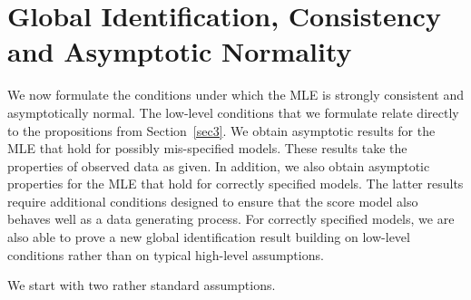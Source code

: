 



























\section{Global Identification, Consistency and Asymptotic Normality} %
\label{sec4}


We now formulate the conditions under which the MLE is strongly consistent and asymptotically normal.
The low-level conditions that we formulate relate directly to the propositions from
Section~\ref{sec3}.
We obtain asymptotic results for the MLE that hold for possibly mis-specified models. These results take the properties of observed data as given. In addition, we also obtain asymptotic properties for the MLE that hold for correctly specified models. The latter results require additional conditions designed to ensure that the score model also behaves well as a data generating process. 
For correctly specified models, we are also able to prove a
new global identification result building on low-level conditions rather than on typical high-level assumptions.

We start with two rather standard assumptions.

